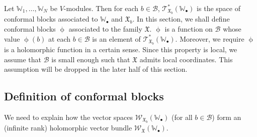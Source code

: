 \documentclass[12pt,a4paper,notitlepage]{article}
\theoremstyle{definition}
\theoremstyle{plain}
\newcommand{\fk}{\mathfrak}
\newcommand{\mc}{\mathcal}
\newcommand{\scr}{\mathscr}
\newcommand{\blt}{\bullet}
\newcommand{\Wbb}{\mathbb W}
\numberwithin{equation}{section}
\begin{document}
Let $\Wbb_1,\dots,\Wbb_N$ be $V$-modules. Then for each $b\in\mc B$, $\scr T_{\fk X_b}^*(\Wbb_\blt)$ is the space of conformal blocks associated to $\Wbb_\blt$ and $\fk X_b$. In this section, we shall define conformal blocks $\upphi$ associated to the family $\fk X$. $\upphi$ is a function on $\mc B$ whose value $\upphi(b)$ at each $b\in\mc B$ is an element of $\scr T_{\fk X_b}^*(\Wbb_\blt)$. Moreover, we require $\upphi$ is a holomorphic function in a certain sense. Since this property is local, we  assume  that $\mc B$ is small enough such that $\fk X$ admits local coordinates. This assumption will be dropped in the later half of this section.



\subsection*{Definition of conformal blocks}

We need to explain how the vector spaces $\scr W_{\fk X_b}(\Wbb_\blt)$ (for all $b\in\mc B$) form an (infinite rank) holomorphic vector bundle $\scr W_{\fk X}(\Wbb_\blt)$.
\end{document}
